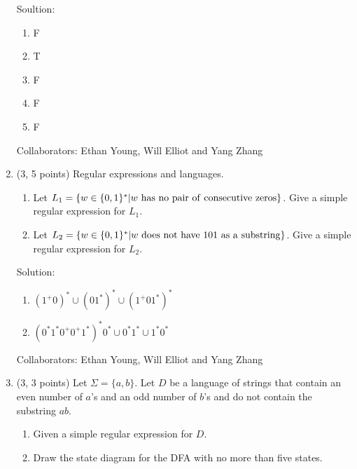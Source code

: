 \documentclass[11pt]{article}
\begin{document}
\begin{enumerate}
Soultion:
\begin{enumerate}
\item F
\item T
\item F
\item F
\item F
\end{enumerate}

Collaborators: Ethan Young, Will Elliot and Yang Zhang

\item (3, 5 points) Regular expressions and languages.
\begin{enumerate}
\item Let $L_1=\{w\in\{0,1\}^* | w{\rm\ has\ no\ pair\ of\ consecutive\ zeros}\}$. Give a simple regular expression for $L_1$. 
\item Let $L_2=\{w\in\{0,1\}^* | w{\rm\ does\ not\ have\ 101\ as\ a\ substring}\}$. Give a simple regular expression for $L_2$.
\end{enumerate}

Solution:

\begin{enumerate}
\item $(1^{+}0)^{*} \cup (01^{*})^{*} \cup (1^{+}01^{*})^{*} $
\item $(0^{*}1^{*}0^{+}0^{+}1^{*})^{*}0^{*} \cup 0^{*}1^{*} \cup 1^{*}0^{*}$
\end{enumerate}

Collaborators: Ethan Young, Will Elliot and Yang Zhang

\item (3, 3 points) Let $\Sigma=\{a, b\}$.
Let $D$ be a language of strings that contain an even number of $a$'s and an odd number of $b$'s and do not contain the substring $ab$.

\begin{enumerate}
\item Given a simple regular expression for $D$.
\item Draw the state diagram for the DFA with no more than five states.
\end{enumerate}


\end{enumerate}
\end{document}
